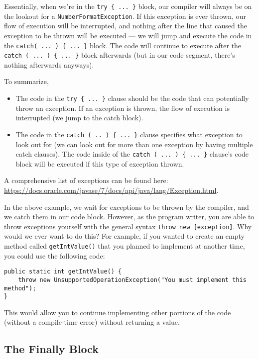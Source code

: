 Essentially, when we're in the \verb!try { ... }! block, our compiler will always be on the lookout for a \verb!NumberFormatException!. If this exception is ever thrown, our flow of execution will be interrupted, and nothing after the line that caused the exception to be thrown will be executed --- we will jump and execute the code in the \verb!catch( ... ) { ... }! block. The code will continue to execute after the \verb!catch ( ... ) { ... }! block afterwards (but in our code segment, there's nothing afterwards anyways).

To summarize,
\begin{itemize}
    \item The code in the \verb!try { ... }! clause should be the code that can potentially throw an exception. If an exception is thrown, the flow of execution is interrupted (we jump to the catch block).
    \item The code in the \verb!catch ( .. ) { ... }! clause specifies what exception to look out for (we can look out for more than one exception by having multiple catch clauses). The code inside of the \verb!catch ( ... ) { ... }! clause's code block will be executed if this type of exception thrown. 
\end{itemize}


A comprehensive list of exceptions can be found here: \url{https://docs.oracle.com/javase/7/docs/api/java/lang/Exception.html}.


In the above example, we wait for exceptions to be thrown by the compiler, and we catch them in our code block. However, as the program writer, you are able to throw exceptions yourself with the general syntax \verb!throw new [exception]!. Why would we ever want to do this? For example, if you wanted to create an empty method called \verb!getIntValue()! that you planned to implement at another time, you could use the following code:

\begin{lstlisting}
public static int getIntValue() {
    throw new UnsupportedOperationException("You must implement this method");
}
\end{lstlisting}

This would allow you to continue implementing other portions of the code (without a compile-time error) without returning a value. 

\subsection{The Finally Block}

